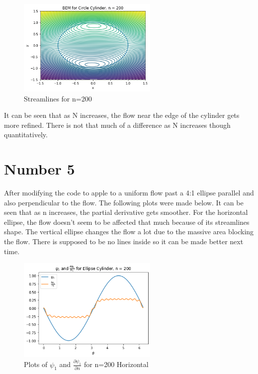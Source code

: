 \documentclass{article}
\begin{document}
		\begin{figure}[H]
			\centering
			\includegraphics[width=0.6\textwidth]{images/c200v4.png}
			\caption{ Streamlines for n=200}
		\end{figure}
	
		It can be seen that as N increases, the flow near the edge of the cylinder gets more refined. There is not that much of a difference as N increases though quantitatively.

		
	\section*{Number 5}
		After modifying the code to apple to a uniform flow past a 4:1 ellipse parallel and also perpendicular to the flow. The following plots were made below. It can be seen that as n increases, the partial derivative gets smoother. For the horizontal ellipse, the flow doesn't seem to be affected that much because of its streamlines shape. The vertical ellipse changes the flow a lot due to the massive area blocking the flow. There is supposed to be no lines inside so it can be made better next time. 
		
		\begin{figure}[H]
			\centering
			\includegraphics[width=0.6\textwidth]{images/el2001.png}
			\caption{ Plots of $\psi_1$ and $\frac{\partial \psi_1}{\partial n}$ for n=200 Horizontal}
		\end{figure}
	
\end{document}
